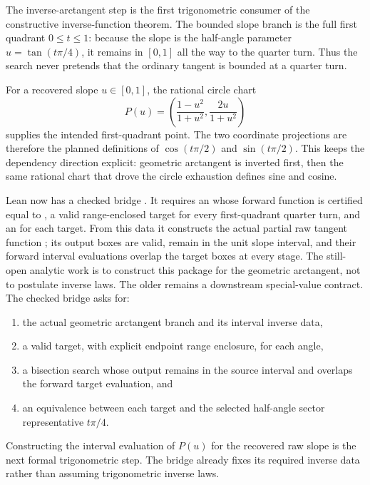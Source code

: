 \begin{definition}
\label{def:inverse-arctan-interface}
{\scriptsize
\par\noindent
{}\par
{}\par
{}
}
The inverse-arctangent step is the first trigonometric consumer of the
constructive inverse-function theorem.  The bounded slope branch is the full
first quadrant \(0\le t\le1\): because the slope is the half-angle parameter
\(u=\tan(t\pi/4)\), it remains in \([0,1]\) all the way to the quarter turn.
Thus the search never pretends that the ordinary tangent is bounded at a
quarter turn.

For a recovered slope \(u\in[0,1]\), the rational circle chart
\[
  P(u)=\left(\frac{1-u^2}{1+u^2},\frac{2u}{1+u^2}\right)
\]
supplies the intended first-quadrant point.  The two coordinate projections are
therefore the planned definitions of \(\cos(t\pi/2)\) and
\(\sin(t\pi/2)\).  This keeps the dependency direction explicit: geometric
arctangent is inverted first, then the same rational chart that drove the
circle exhaustion defines sine and cosine.

Lean now has a checked bridge .  It requires an
 whose forward function is certified equal
to , a valid range-enclosed target for every
first-quadrant quarter turn, and an  for each target.  From this
data it constructs the actual partial raw tangent function
; its output boxes are valid, remain in the unit slope
interval, and their forward interval evaluations overlap the target boxes at
every stage.  The still-open analytic work is to construct this package for
the geometric arctangent, not to postulate inverse laws.  The older
 remains a downstream special-value contract.
The checked bridge asks for:
\begin{enumerate}
\item the actual geometric arctangent branch and its interval inverse data,
\item a valid target, with explicit endpoint range enclosure, for each angle,
\item a bisection search whose output remains in the source interval and
  overlaps the forward target evaluation, and
\item an equivalence between each target and the selected half-angle sector
  representative \(t\pi/4\).
\end{enumerate}
Constructing the interval evaluation of \(P(u)\) for the recovered raw slope
is the next formal trigonometric step.  The bridge already fixes its required
inverse data rather than assuming trigonometric inverse laws.
\end{definition}


